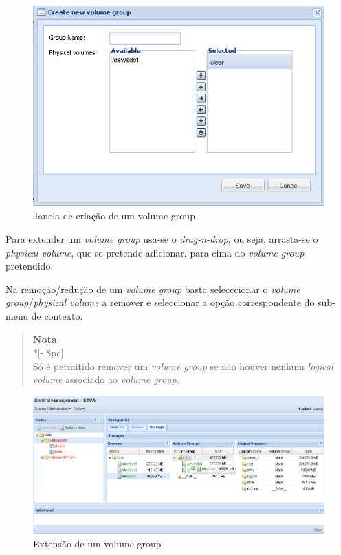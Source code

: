 \begin{figure}[H]
        \begin{center}
        \includegraphics[scale=0.5]{screenshots/storage_vg_create.png}
        \caption{Janela de criação de um volume group}
        \label{fig:storage_vg_create}
        \end{center}
\end{figure}

Para extender um \emph{volume group} usa-se o \emph{drag-n-drop}, ou seja, arrasta-se o \emph{physical volume}, que se pretende adicionar, para cima do \emph{volume group} pretendido.

Na remoção/redução de um \emph{volume group} basta selecccionar o \emph{volume group}/\emph{physical volume} a remover e seleccionar a opção correspondente do sub-menu de contexto.
\begin{quote}
	{\large \bf Nota} \\*[-.8pc]
	\underline{\hspace{6in}} \\
	Só é permitido remover um \emph{volume group} se não houver nenhum \emph{logical volume} associado ao \emph{volume group}.
\end{quote}
 
\begin{figure}[H]
        \begin{center}
        \includegraphics[scale=0.5]{screenshots/storage_vg_extend.png}
        \caption{Extensão de um volume group}
        \label{fig:storage_vg_extend}
        \end{center}
\end{figure}

